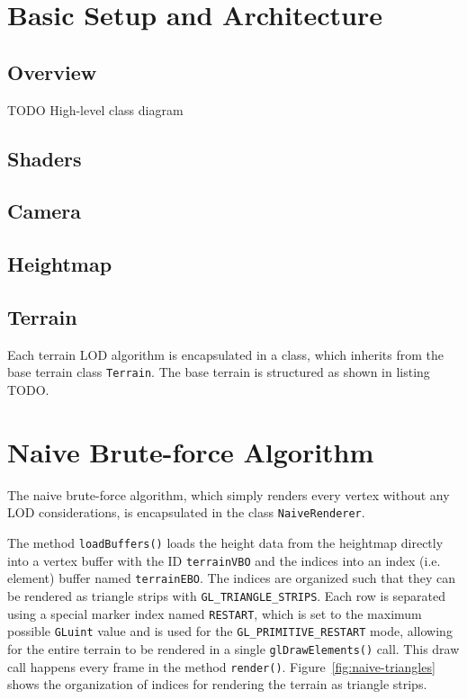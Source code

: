 \section{Basic Setup and Architecture}
\subsection{Overview}
TODO High-level class diagram
\subsection{Shaders}

\subsection{Camera}

\subsection{Heightmap}

\subsection{Terrain}
Each terrain LOD algorithm is encapsulated in a class, which inherits from the base terrain class \texttt{Terrain}.
The base terrain is structured as shown in listing TODO.

\section{Naive Brute-force Algorithm}
The naive brute-force algorithm, which simply renders every vertex without any LOD considerations, is encapsulated in the class \texttt{NaiveRenderer}.

The method \texttt{loadBuffers()} loads the height data from the heightmap directly into a vertex buffer with the ID \texttt{terrainVBO} and the indices into an index (i.e. element) buffer named \texttt{terrainEBO}.
The indices are organized such that they can be rendered as triangle strips with \texttt{GL\_TRIANGLE\_STRIPS}.
Each row is separated using a special marker index named \texttt{RESTART}, which is set to the maximum possible \texttt{GLuint} value and is used for the \texttt{GL\_PRIMITIVE\_RESTART} mode,
allowing for the entire terrain to be rendered in a single \texttt{glDrawElements()} call. This draw call happens every frame in the 
method \texttt{render()}. Figure~\ref{fig:naive-triangles} shows the organization of indices for rendering the terrain as triangle strips.

